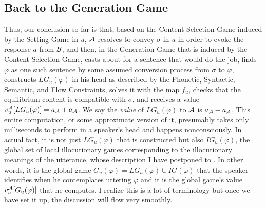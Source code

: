 \subsection{Back to the Generation Game}\largerpage
Thus, our conclusion so far is that, based on the Content Selection Game induced by the Setting Game in $u$, $\cal A$ resolves to convey $\sigma$ in $u$ in order to evoke the response $a$ from $\cal B$, and then, in the Generation Game that is induced by the Content Selection Game, casts about for a sentence that would do the job, finds $\varphi$ as one such sentence by some assumed conversion process from $\sigma$ to $\varphi$, constructs $LG_u(\varphi)$ in his head as described by the Phonetic, Syntactic, Semantic, and Flow Constraints, solves it with the map $f_u$, checks that the equilibrium content is compatible with $\sigma$, and receives a value $v_u^{\cal A}[LG_u(\varphi)] = a_{\cal A} + a_{\cal A}$. We say the \emph{value} of $LG_u(\varphi)$ to $\cal A$ is $a_{\cal A} + a_{\cal A}$. This entire computation, or some approximate version of it, presumably takes only milliseconds to perform in a speaker's head and happens nonconsciously. In actual fact, it is not just $LG_u(\varphi)$ that is constructed but also $IG_u(\varphi)$, the global set of local illocutionary games corresponding to the illocutionary meanings of the utterance, whose description I have postponed to . In other words, it is the global game $G_u(\varphi) = LG_u(\varphi) \cup IG(\varphi)$ that the speaker identifies when he contemplates uttering $\varphi$ and it is the global game's value $v_u^{\cal A}[G_u(\varphi)]$ that he computes. I realize this is a lot of terminology but once we have set it up, the discussion will flow very smoothly.


